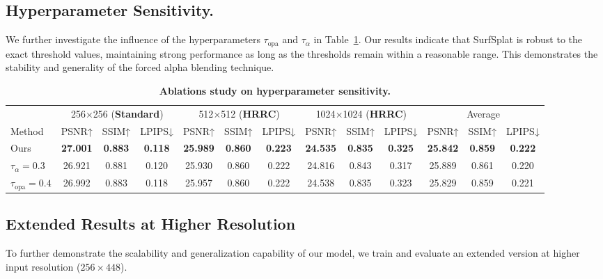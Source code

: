 \subsection{Hyperparameter Sensitivity.} 
We further investigate the influence of the hyperparameters $\tau_{\text{opa}}$ and $\tau_{\alpha}$ in Table~\ref{hyper}. Our results indicate that SurfSplat is robust to the exact threshold values, maintaining strong performance as long as the thresholds remain within a reasonable range. This demonstrates the stability and generality of the forced alpha blending technique.

\begin{table}[ht]
\centering
\caption{\textbf{Ablations study on hyperparameter sensitivity.}}
\label{hyper}
\fontsize{7}{11.5}\selectfont
\setlength{\tabcolsep}{4pt}
\begin{tabular}{lccc|ccc|ccc|ccc}
\toprule
& \multicolumn{3}{c|}{256$\times$256 (\textbf{Standard})} & \multicolumn{3}{c|}{512$\times$512 (\textbf{HRRC})} & \multicolumn{3}{c|}{1024$\times$1024 (\textbf{HRRC})} & \multicolumn{3}{c}{Average} \\
Method & PSNR↑ & SSIM↑ & LPIPS↓ & PSNR↑ & SSIM↑ & LPIPS↓ & PSNR↑ & SSIM↑ & LPIPS↓ & PSNR↑ & SSIM↑ & LPIPS↓ \\
\midrule
Ours  & \textbf{27.001} & \textbf{0.883} & \textbf{0.118} & \textbf{25.989} & \textbf{0.860} & \textbf{0.223} & \textbf{24.535} & \textbf{0.835} & \textbf{0.325} & \textbf{25.842} & \textbf{0.859} & \textbf{0.222} \\
$\tau_\alpha = 0.3$  & 26.921 & 0.881 & 0.120 & 25.930 & 0.860 & 0.222 & 24.816 & 0.843 & 0.317 & 25.889 & 0.861 & 0.220 \\
$\tau_{\text{opa}} = 0.4$ & 26.992 & 0.883 & 0.118 & 25.957 & 0.860 & 0.222 & 24.538 & 0.835 & 0.323 & 25.829 & 0.859 & 0.221 \\
\bottomrule
\end{tabular}
\end{table}


\subsection{Extended Results at Higher Resolution}
\label{hq}

To further demonstrate the scalability and generalization capability of our model, we train and evaluate an extended version at higher input resolution ($256 \times 448$). 

